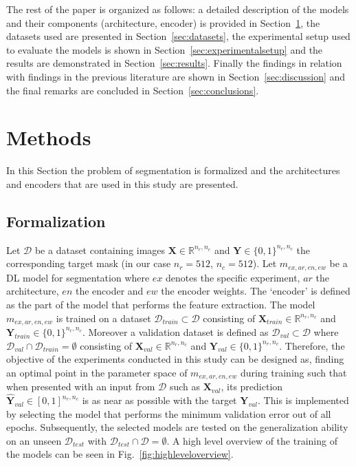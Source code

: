 \documentclass{elsarticle}
\begin{document}
The rest of the paper is organized as follows: a detailed description of the models and their components (architecture, encoder) is provided in Section~\ref{sec:methods}, the datasets used are presented in Section~\ref{sec:datasets}, the experimental setup used to evaluate the models is shown in Section~\ref{sec:experimentalsetup} and the results are demonstrated in Section~\ref{sec:results}. Finally the findings in relation with findings in the previous literature are shown in Section~\ref{sec:discussion} and the final remarks are concluded in Section~\ref{sec:conclusions}.

\section{Methods}\label{sec:methods}
In this Section the problem of segmentation is formalized and the architectures and encoders that are used in this study are presented.

\subsection{Formalization}
Let $\mathcal{D}$ be a dataset containing images $\bm{X} \in \mathbb{R}^{n_r, n_c}$ and $\bm{Y} \in \{0, 1\}^{n_r, n_c}$ the corresponding target mask (in our case $n_r=512$, $n_c=512$). %
Let $m_{ex, ar, en, ew}$ be a DL model for segmentation where $ex$ denotes the specific experiment, $ar$ the architecture, $en$ the encoder and $ew$ the encoder weights.
The `encoder' is defined as the part of the model that performs the feature extraction.
The model $m_{ex, ar, en, ew}$ is trained on a dataset $\mathcal{D}_{train}\subset\mathcal{D}$ consisting of $\bm{X}_{train} \in \mathbb{R}^{n_r, n_c}$ and $\bm{Y}_{train} \in \{0, 1\}^{n_r, n_c}$. %
Moreover a validation dataset is defined as $\mathcal{D}_{val}\subset\mathcal{D}$ where $\mathcal{D}_{val}\cap\mathcal{D}_{train}=\emptyset$ consisting of $\bm{X}_{val} \in \mathbb{R}^{n_r, n_c}$ and $\bm{Y}_{val} \in \{0, 1\}^{n_r, n_c}$. %
Therefore, the objective of the experiments conducted in this study can be designed as, finding an optimal point in the parameter space of $m_{ex, ar, en, ew}$ during training such that when presented with an input from $\mathcal{D}$ such as $\bm{X}_{val}$, its prediction $\hat{\bm{Y}}_{val} \in [0, 1]^{n_r, n_c}$ is as near as possible with the target $\bm{Y}_{val}$. %
This is implemented by selecting the model that performs the minimum validation error out of all epochs.
Subsequently, the selected models are tested on the generalization ability on an unseen $\mathcal{D}_{test}$ with $\mathcal{D}_{test}\cap\mathcal{D}=\emptyset$.
A high level overview of the training of the models can be seen in Fig.~\ref{fig:highleveloverview}.
\end{document}
